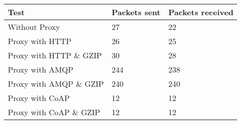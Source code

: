 \begin{tabular}{|l|l|l|}
\hline
\textbf{Test} & \textbf{Packets sent} & \textbf{Packets received} \\ \hline
Without Proxy                    &27         & 22        \\ \hline 
Proxy with HTTP                  &26         & 25        \\ \hline 
Proxy with HTTP \& GZIP          &30         & 28        \\ \hline 
Proxy with AMQP                  &244        & 238       \\ \hline 
Proxy with AMQP \& GZIP          &240        & 240       \\ \hline 
Proxy with CoAP                  &12         & 12        \\ \hline 
Proxy with CoAP \& GZIP          &12         & 12        \\ \hline 
\end{tabular}